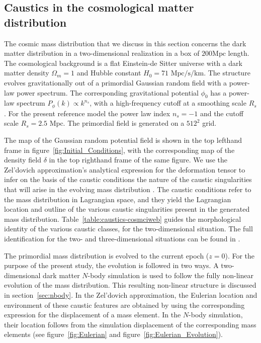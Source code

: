 \documentclass[a4paper, 11pt]{article}
\begin{document}
\subsection{Caustics in the cosmological matter distribution}
\label{sec:primordial}
The cosmic mass distribution that we discuss in this section concerns the dark matter distribution in a two-dimensional realization in a box of $200 \mbox{Mpc}$ length. The cosmological background is a flat Einstein-de Sitter universe with a dark matter density $\Omega_m=1$ and Hubble constant $H_0=71\text{ Mpc/s/km}$. The structure evolves gravitationally out of a primordial Gaussian random field with a power-law power spectrum. The corresponding gravitational potential $\phi_0$ has a power-law spectrum $P_{\phi}(k) \propto k^{n_s}$, with a high-frequency cutoff at a smoothing scale $R_s$. For the present reference model the power law index $n_s=-1$ and the cutoff scale
$R_s=2.5 \text{ Mpc}$. The primordial field is generated on a $512^2$ grid.

The map of the Gaussian random potential field is shown in the top lefthand frame in figure~\ref{fig:Initial_Conditions}, with the corresponding map of the density field $\delta$ in the top righthand frame of the same figure. We use the Zel'dovich approximation's analytical expression for the deformation tensor to infer on the basis of the caustic conditions the nature of the caustic singularities that will arise in the evolving mass distribution \cite{Feldbrugge:2018}. The caustic conditions refer to the mass distribution in Lagrangian space, and they yield the Lagrangian location and outline of the various caustic singularities present in the generated mass distribution.  Table~\ref{table:caustics-cosmciweb} guides the morphological identity of the various caustic classes, for the two-dimensional situation. The full identification for the two- and three-dimensional situations can be found in \cite{Feldbrugge:2018}.

The primordial mass distribution is evolved to the current epoch ($z=0$). For the purpose of the present study, the evolution is followed in two ways. A two-dimensional dark matter $N$-body simulation \cite{Hidding:2020} is used to follow the fully non-linear evolution of the mass distribution. This resulting non-linear structure is discussed in section~\ref{sec:nbody}. In the Zel'dovich approximation, the Eulerian location and environment of these caustic features are obtained by using the corresponding expression for the displacement of a mass element. In the $N$-body simulation, their location follows from the simulation displacement of the corresponding mass elements (see figure~\ref{fig:Eulerian} and figure~\ref{fig:Eulerian_Evolution}).
\end{document}
